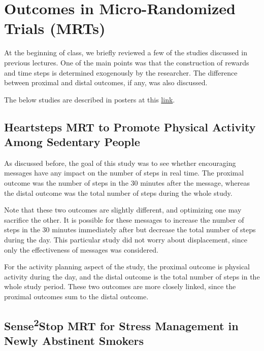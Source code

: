 \documentclass[11pt]{article}
\begin{document}


\section{Outcomes in Micro-Randomized Trials (MRTs)}

At the beginning of class, we briefly reviewed a few of the studies discussed in previous lectures. One of the main points was that the construction of rewards and time steps is determined exogenously by the researcher. The difference between proximal and distal outcomes, if any, was also discussed. 

The below studies are described in posters at this \href{https://methodology.psu.edu/ra/adap-inter/mrt-projects#proj}{link}.

\subsection{Heartsteps MRT to Promote Physical Activity Among Sedentary People}

As discussed before, the goal of this study was to see whether encouraging messages have any impact on the number of steps in real time. The proximal outcome was the number of steps in the 30 minutes after the message, whereas the distal outcome was the total number of steps during the whole study. 

Note that these two outcomes are slightly different, and optimizing one may sacrifice the other. It is possible for these messages to increase the number of steps in the 30 minutes immediately after but decrease the total number of steps during the day. This particular study did not worry about displacement, since only the effectiveness of messages was considered.

For the activity planning aspect of the study, the proximal outcome is physical activity during the day, and the distal outcome is the total number of steps in the whole study period. These two outcomes are more closely linked, since the proximal outcomes sum to the distal outcome.

\subsection{Sense\texorpdfstring{\textsuperscript{2}}{2}Stop MRT for Stress Management in Newly Abstinent Smokers}
\end{document}

